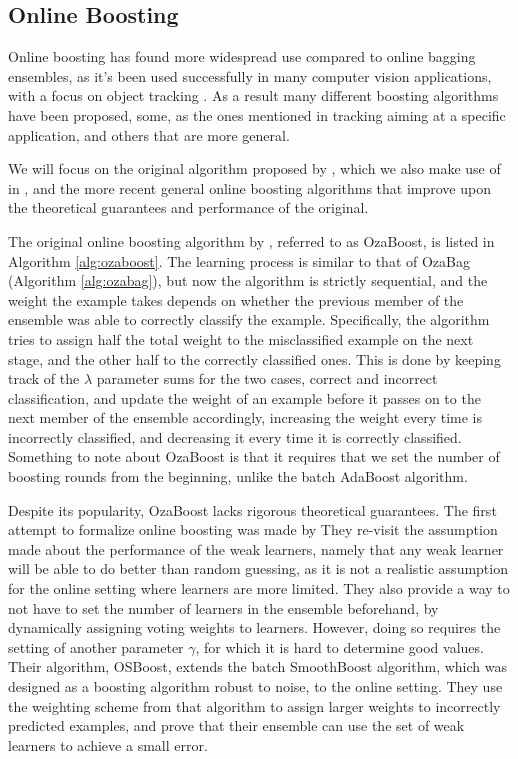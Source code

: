 \subsection{Online Boosting}

Online boosting has found more widespread use compared to online bagging ensembles,
as it's been used successfully in many computer vision applications, with a focus on
object tracking \cite{online-boost-cv4, online-boost-cv, online-boost-cv3, online-boost-cv2, online-boost-cv5, online-boost-cv-6}.
As a result many different boosting algorithms have been proposed, some, as the ones
mentioned in tracking aiming at a specific application, and others that are more general.

We will focus on the original algorithm proposed by \citeauthor{Oza2001online},
which we also make use of in \boostvht,
and the more recent general online boosting algorithms that improve upon the
theoretical guarantees and performance of the original.

The original online boosting algorithm by \citeauthor{Oza2001online}, referred to as
OzaBoost, is listed
in Algorithm \ref{alg:ozaboost}.
The learning process is similar to that of OzaBag (Algorithm \ref{alg:ozabag}), but now the
algorithm is strictly sequential, and the weight the example takes depends on whether
the previous member of the ensemble was able to correctly classify the example.
Specifically, the algorithm tries to assign half the total weight to the misclassified
example on the next stage, and the other half to the correctly classified ones.
This is done by keeping track of the $\lambda$ parameter sums for the two cases,
correct and incorrect classification, and update the weight of an example
before it passes on to the next member of the ensemble accordingly, increasing
the weight every time is incorrectly classified, and decreasing it every time it
is correctly classified.  Something to note about OzaBoost is that it requires
that we set the number of boosting rounds from the beginning, unlike the
batch AdaBoost algorithm.

Despite its popularity, OzaBoost lacks rigorous theoretical guarantees.
The first attempt to formalize online boosting was made by \citet{online-boosting-theoretical}
They re-visit the assumption made about the performance of the weak
learners, namely that any weak learner will be able to
do better than random guessing, as it is not a realistic assumption
for the online setting where learners are more limited. They also
provide a way to not have to set the number of learners in the ensemble beforehand,
by dynamically assigning voting weights to learners.
However, doing so requires the setting of another parameter $\gamma$,
for which it is hard to determine good values.
Their algorithm, OSBoost,
extends the batch SmoothBoost \cite{smoothboost} algorithm, which
was designed as a boosting algorithm robust to noise, to the online
setting. They use the weighting scheme from that algorithm to assign
larger weights to incorrectly predicted examples, and prove that
their ensemble can use the set of weak learners to achieve a small
error.

